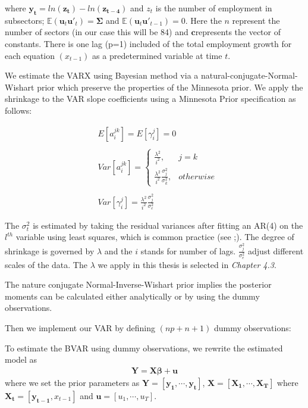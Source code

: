 \documentclass{monashthesis}
\begin{document}
where \(\bm{y_t} = ln(\bm{z_t})-ln(\bm{z_{t-4}})\) and \(z_t\) is the number of employment in subsectors; \(\mathbb{E}(\bm{u}_t\bm{u}'_t)=\bm{\Sigma}\) and \(\mathbb{E}(\bm{u}_t\bm{u'}_{t-1})=0\). Here the \(n\) represent the number of sectors (in our case this will be 84) and \(\bm{c}\)represents the vector of constants. There is one lag (p=1) included of the total employment growth for each equation \((x_{t-1})\) as a predetermined variable at time \(t\).

We estimate the VARX using Bayesian method via a natural-conjugate-Normal-Wishart prior which preserve the properties of the Minnesota prior. We apply the shrinkage to the VAR slope coefficients using a Minnesota Prior specification as follows:

\[
\begin{aligned}
&E[a_{i}^{jk}] = E[\gamma_{i}^j]=0\\
\\
&Var[a_i^{jk}]= 
\begin{cases}
\frac{\lambda^2}{i^2},&j=k\\
\frac{\lambda^2}{i^2}\frac{\sigma^2_{j}}{\sigma^2_k},& otherwise
\end{cases}\\
\\
&Var[\gamma_i^{j}]=\frac{\lambda^2}{i^2}\frac{\sigma^2_{j}}{\sigma^2_e}
\end{aligned}
\]

The \(\sigma^2_{t}\) is estimated by taking the residual variances after fitting an AR(4) on the \(l^{th}\) variable using least squares, which is common practice (see \textcite{anderson2020};\textcite{banbura2010large}). The degree of shrinkage is governed by \(\lambda\) and the \(i\) stands for number of lags. \(\frac{\sigma^2_{j}}{\sigma^2_e}\) adjust different scales of the data. The \(\lambda\) we apply in this thesis is selected in \emph{Chapter 4.3}.

The nature conjugate Normal-Inverse-Wishart prior implies the posterior moments can be calculated either analytically or by using the dummy observations.

Then we implement our VAR by defining \((np+n+1)\) dummy observations:

To estimate the BVAR using dummy observations, we rewrite the estimated model as
\[
\begin{aligned}
\bm{Y} = \bm{X}\bm{\beta}+\bm{u}
\end{aligned}
\]
where we set the prior parameters as \(\bm{Y} = [\bm{y_1},\cdots,\bm{y_t}]\), \(\bm{X} = [\bm{X_1},\cdots,\bm{X_T}]\) where \(\bm{X_t}=[\bm{y_{t-1}}, x_{t-1}]\) and \(\bm{u} = [u_1,\cdots,u_T]\).
\end{document}
